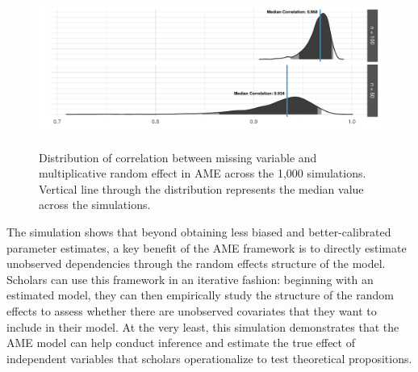 \begin{figure}
	\centering
	\caption{Distribution of correlation between missing variable and multiplicative random effect in AME across the 1,000 simulations. Vertical line through the distribution represents the median value across the simulations.}
	\label{fig:ameCorr}
	\includegraphics[width=1\textwidth]{graphics/ameSimCorr.pdf} \\
\end{figure}

The simulation shows that beyond obtaining less biased and better-calibrated parameter estimates, a key benefit of the AME framework is to directly estimate unobserved dependencies through the random effects structure of the model. Scholars can use this framework in an iterative fashion: beginning with an estimated model, they can then empirically study the structure of the random effects to assess whether there are unobserved covariates that they want to include in their model. At the very least,  this simulation  demonstrates that the AME model can help conduct inference and estimate the true effect of independent variables that scholars operationalize to test theoretical propositions.
